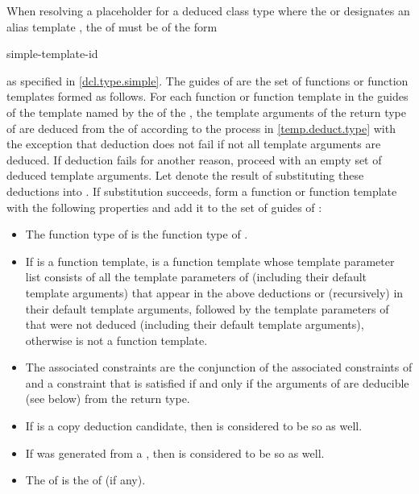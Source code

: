 \pnum
When resolving a placeholder for a deduced class type
where
the  or 
designates an alias template ,
the  of  must be of the form
\begin{ncsimplebnf}
   simple-template-id
\end{ncsimplebnf}
as specified in \ref{dcl.type.simple}.
The guides of  are the set of functions or function templates
formed as follows.
For each function or function template  in the guides of
the template named by the 
of the ,
the template arguments of the return type of 
are deduced
from the  of 
according to the process in \ref{temp.deduct.type}
with the exception that deduction does not fail
if not all template arguments are deduced.
If deduction fails for another reason,
proceed with an empty set of deduced template arguments.
Let  denote the result of substituting
these deductions into .
If substitution succeeds,
form a function or function template 
with the following properties and add it to the set
of guides of :
\begin{itemize}
\item
The function type of  is the function type of .

\item
If  is a function template,
 is a function template whose
template parameter list consists of
all the template parameters of 
(including their default template arguments)
that appear in the above deductions or
(recursively) in their default template arguments,
followed by the template parameters of  that were not deduced
(including their default template arguments),
otherwise  is not a function template.

\item
The associated constraints are
the conjunction of the associated constraints of  and
a constraint that is satisfied if and only if
the arguments of  are deducible (see below) from the return type.

\item
If  is a copy deduction candidate,
then  is considered to be so as well.

\item
If  was generated
from a ,
then  is considered to be so as well.

\item
The  of  is
the  of  (if any).
\end{itemize}

